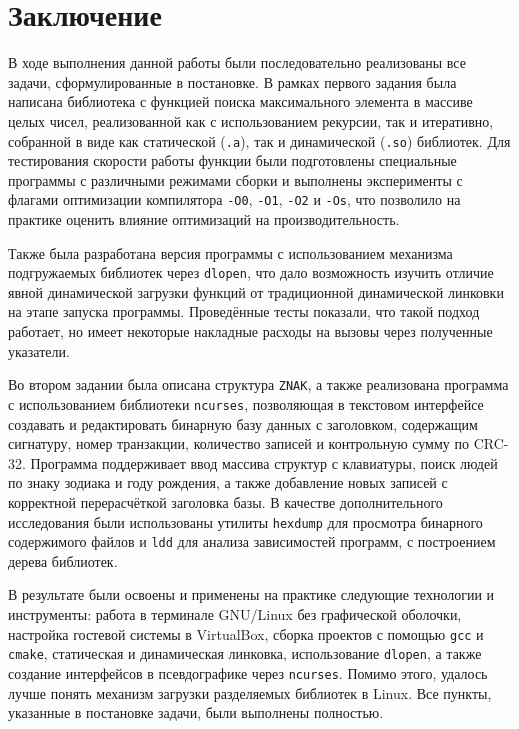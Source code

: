\section*{Заключение}

В ходе выполнения данной работы были последовательно реализованы все задачи, сформулированные в постановке. В рамках первого задания была написана библиотека с функцией поиска максимального элемента в массиве целых чисел, реализованной как с использованием рекурсии, так и итеративно, собранной в виде как статической (\texttt{.a}), так и динамической (\texttt{.so}) библиотек. Для тестирования скорости работы функции были подготовлены специальные программы с различными режимами сборки и выполнены эксперименты с флагами оптимизации компилятора \texttt{-O0}, \texttt{-O1}, \texttt{-O2} и \texttt{-Os}, что позволило на практике оценить влияние оптимизаций на производительность.

Также была разработана версия программы с использованием механизма подгружаемых библиотек через \texttt{dlopen}, что дало возможность изучить отличие явной динамической загрузки функций от традиционной динамической линковки на этапе запуска программы. Проведённые тесты показали, что такой подход работает, но имеет некоторые накладные расходы на вызовы через полученные указатели.

Во втором задании была описана структура \texttt{ZNAK}, а также реализована программа с использованием библиотеки \texttt{ncurses}, позволяющая в текстовом интерфейсе создавать и редактировать бинарную базу данных с заголовком, содержащим сигнатуру, номер транзакции, количество записей и контрольную сумму по CRC-32. Программа поддерживает ввод массива структур с клавиатуры, поиск людей по знаку зодиака и году рождения, а также добавление новых записей с корректной перерасчёткой заголовка базы. В качестве дополнительного исследования были использованы утилиты \texttt{hexdump} для просмотра бинарного содержимого файлов и \texttt{ldd} для анализа зависимостей программ, с построением дерева библиотек.

В результате были освоены и применены на практике следующие технологии и инструменты: работа в терминале GNU/Linux без графической оболочки, настройка гостевой системы в VirtualBox, сборка проектов с помощью \texttt{gcc} и \texttt{cmake}, статическая и динамическая линковка, использование \texttt{dlopen}, а также создание интерфейсов в псевдографике через \texttt{ncurses}. Помимо этого, удалось лучше понять механизм загрузки разделяемых библиотек в Linux. Все пункты, указанные в постановке задачи, были выполнены полностью.
